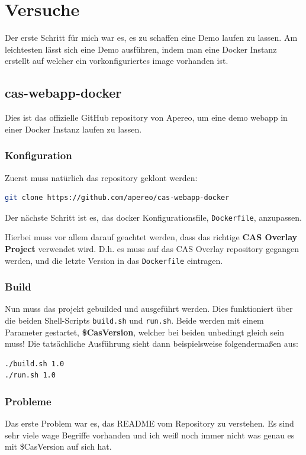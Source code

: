 \section{Versuche}
\label{sec:Versuche}
Der erste Schritt für mich war es, es zu schaffen eine Demo laufen zu lassen. Am leichtesten lässt sich eine Demo ausführen, indem man eine Docker Instanz erstellt auf welcher ein vorkonfiguriertes image vorhanden ist. 

\subsection{cas-webapp-docker}
\cite{Apereio}

Dies ist das offizielle GitHub repository von Apereo, um eine demo webapp in einer Docker Instanz laufen zu lassen.

\subsubsection{Konfiguration}
Zuerst muss natürlich das repository geklont werden:
\begin{lstlisting}[language=bash]
	git clone https://github.com/apereo/cas-webapp-docker
\end{lstlisting}

Der nächste Schritt ist es, das docker Konfigurationsfile, \verb|Dockerfile|, anzupassen.

Hierbei muss vor allem darauf geachtet werden, dass das richtige \textbf{CAS Overlay Project} verwendet wird. D.h. es muss auf das CAS Overlay repository\cite{Apereo} gegangen werden, und die letzte Version in das \verb|Dockerfile| eintragen.

\subsubsection{Build}
Nun muss das projekt gebuilded und ausgeführt werden. Dies funktioniert über die beiden Shell-Scripts \verb|build.sh| und \verb|run.sh|. Beide werden mit einem Parameter gestartet, \textbf{\$CasVersion}, welcher bei beiden unbedingt gleich sein muss! Die tatsächliche Ausführung sieht dann beispielsweise folgendermaßen aus:

\begin{lstlisting}[language=bash]
./build.sh 1.0
./run.sh 1.0
\end{lstlisting}

\subsubsection{Probleme}
Das erste Problem war es, das README vom Repository zu verstehen. Es sind sehr viele wage Begriffe vorhanden und ich weiß noch immer nicht was genau es mit \$CasVersion auf sich hat.


